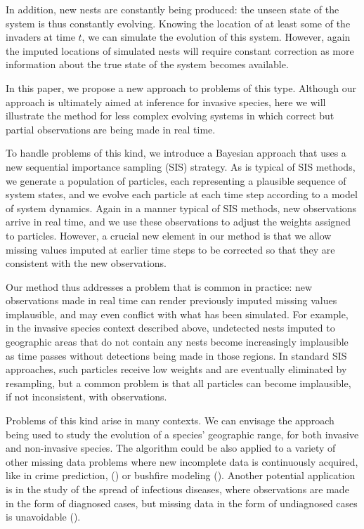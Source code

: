 In addition, new nests are constantly being produced: the unseen state of the system is thus constantly evolving. Knowing the location of at least some of the invaders at time $t$, we can simulate the evolution of this system. However, again the imputed locations of simulated nests will require constant correction as more information about the true state of the system becomes available.

In this paper, we propose a new approach to problems of this type. Although our approach is ultimately aimed at inference for invasive species, here we will illustrate the method for less complex evolving systems in which correct but partial observations are being made in real time.

To handle problems of this kind, we introduce a Bayesian approach that uses a new sequential importance sampling (SIS) strategy. As is typical of SIS methods, we generate a population of particles, each representing a plausible sequence of system states, and we evolve each particle at each time step according to a model of system dynamics. Again in a manner typical of SIS methods, new observations arrive in real time, and we use these observations to adjust the weights assigned to particles. However, a crucial new element in our method is that we allow missing values imputed at earlier time steps to be corrected so that they are consistent with the new observations.

Our method thus addresses a problem that is common in practice: new observations made in real time can render previously imputed missing values implausible, and may even conflict with what has been simulated. For example, in the invasive species context described above, undetected nests imputed to geographic areas that do not contain any nests become increasingly implausible as time passes without detections being made in those regions. In standard SIS approaches, such particles receive low weights and are eventually eliminated by resampling, but a common problem is that all particles can become implausible, if not inconsistent, with observations.

Problems of this kind arise in many contexts. We can envisage the approach being used to study the evolution of a species' geographic range, for both invasive and non-invasive species. The algorithm could be also applied to a variety of other missing data problems where new incomplete data is continuously acquired, like in crime prediction, (\cite{Malathy}) or bushfire modeling (\cite{Beer}). Another potential application is in the study of the spread of infectious diseases, where observations are made in the form of diagnosed cases, but missing data in the form of undiagnosed cases is unavoidable (\cite{O'Neill}). 

